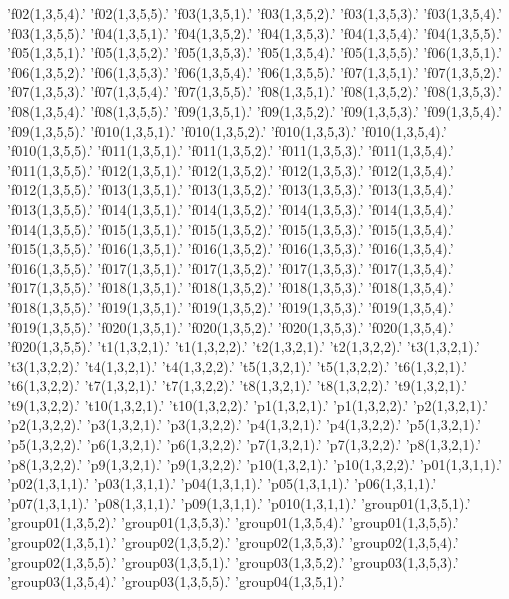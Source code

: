 'f02(1,3,5,4).'
'f02(1,3,5,5).'
'f03(1,3,5,1).'
'f03(1,3,5,2).'
'f03(1,3,5,3).'
'f03(1,3,5,4).'
'f03(1,3,5,5).'
'f04(1,3,5,1).'
'f04(1,3,5,2).'
'f04(1,3,5,3).'
'f04(1,3,5,4).'
'f04(1,3,5,5).'
'f05(1,3,5,1).'
'f05(1,3,5,2).'
'f05(1,3,5,3).'
'f05(1,3,5,4).'
'f05(1,3,5,5).'
'f06(1,3,5,1).'
'f06(1,3,5,2).'
'f06(1,3,5,3).'
'f06(1,3,5,4).'
'f06(1,3,5,5).'
'f07(1,3,5,1).'
'f07(1,3,5,2).'
'f07(1,3,5,3).'
'f07(1,3,5,4).'
'f07(1,3,5,5).'
'f08(1,3,5,1).'
'f08(1,3,5,2).'
'f08(1,3,5,3).'
'f08(1,3,5,4).'
'f08(1,3,5,5).'
'f09(1,3,5,1).'
'f09(1,3,5,2).'
'f09(1,3,5,3).'
'f09(1,3,5,4).'
'f09(1,3,5,5).'
'f010(1,3,5,1).'
'f010(1,3,5,2).'
'f010(1,3,5,3).'
'f010(1,3,5,4).'
'f010(1,3,5,5).'
'f011(1,3,5,1).'
'f011(1,3,5,2).'
'f011(1,3,5,3).'
'f011(1,3,5,4).'
'f011(1,3,5,5).'
'f012(1,3,5,1).'
'f012(1,3,5,2).'
'f012(1,3,5,3).'
'f012(1,3,5,4).'
'f012(1,3,5,5).'
'f013(1,3,5,1).'
'f013(1,3,5,2).'
'f013(1,3,5,3).'
'f013(1,3,5,4).'
'f013(1,3,5,5).'
'f014(1,3,5,1).'
'f014(1,3,5,2).'
'f014(1,3,5,3).'
'f014(1,3,5,4).'
'f014(1,3,5,5).'
'f015(1,3,5,1).'
'f015(1,3,5,2).'
'f015(1,3,5,3).'
'f015(1,3,5,4).'
'f015(1,3,5,5).'
'f016(1,3,5,1).'
'f016(1,3,5,2).'
'f016(1,3,5,3).'
'f016(1,3,5,4).'
'f016(1,3,5,5).'
'f017(1,3,5,1).'
'f017(1,3,5,2).'
'f017(1,3,5,3).'
'f017(1,3,5,4).'
'f017(1,3,5,5).'
'f018(1,3,5,1).'
'f018(1,3,5,2).'
'f018(1,3,5,3).'
'f018(1,3,5,4).'
'f018(1,3,5,5).'
'f019(1,3,5,1).'
'f019(1,3,5,2).'
'f019(1,3,5,3).'
'f019(1,3,5,4).'
'f019(1,3,5,5).'
'f020(1,3,5,1).'
'f020(1,3,5,2).'
'f020(1,3,5,3).'
'f020(1,3,5,4).'
'f020(1,3,5,5).'
't1(1,3,2,1).'
't1(1,3,2,2).'
't2(1,3,2,1).'
't2(1,3,2,2).'
't3(1,3,2,1).'
't3(1,3,2,2).'
't4(1,3,2,1).'
't4(1,3,2,2).'
't5(1,3,2,1).'
't5(1,3,2,2).'
't6(1,3,2,1).'
't6(1,3,2,2).'
't7(1,3,2,1).'
't7(1,3,2,2).'
't8(1,3,2,1).'
't8(1,3,2,2).'
't9(1,3,2,1).'
't9(1,3,2,2).'
't10(1,3,2,1).'
't10(1,3,2,2).'
'p1(1,3,2,1).'
'p1(1,3,2,2).'
'p2(1,3,2,1).'
'p2(1,3,2,2).'
'p3(1,3,2,1).'
'p3(1,3,2,2).'
'p4(1,3,2,1).'
'p4(1,3,2,2).'
'p5(1,3,2,1).'
'p5(1,3,2,2).'
'p6(1,3,2,1).'
'p6(1,3,2,2).'
'p7(1,3,2,1).'
'p7(1,3,2,2).'
'p8(1,3,2,1).'
'p8(1,3,2,2).'
'p9(1,3,2,1).'
'p9(1,3,2,2).'
'p10(1,3,2,1).'
'p10(1,3,2,2).'
'p01(1,3,1,1).'
'p02(1,3,1,1).'
'p03(1,3,1,1).'
'p04(1,3,1,1).'
'p05(1,3,1,1).'
'p06(1,3,1,1).'
'p07(1,3,1,1).'
'p08(1,3,1,1).'
'p09(1,3,1,1).'
'p010(1,3,1,1).'
'group01(1,3,5,1).'
'group01(1,3,5,2).'
'group01(1,3,5,3).'
'group01(1,3,5,4).'
'group01(1,3,5,5).'
'group02(1,3,5,1).'
'group02(1,3,5,2).'
'group02(1,3,5,3).'
'group02(1,3,5,4).'
'group02(1,3,5,5).'
'group03(1,3,5,1).'
'group03(1,3,5,2).'
'group03(1,3,5,3).'
'group03(1,3,5,4).'
'group03(1,3,5,5).'
'group04(1,3,5,1).'
